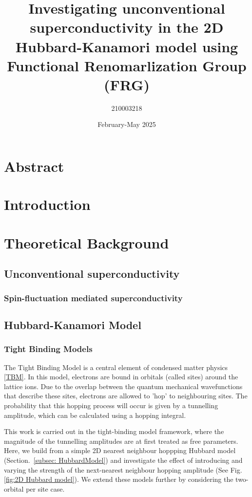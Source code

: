 \documentclass[12pt]{article}
\title{Investigating unconventional superconductivity in the 2D Hubbard-Kanamori model using Functional Renomarlization Group (FRG)}
\author{210003218}
\date{February-May 2025}
\begin{document}
\maketitle
\tableofcontents 


\section{Abstract}

\section{Introduction}

\section{Theoretical Background}

\subsection{Unconventional superconductivity}



\subsubsection{Spin-fluctuation mediated superconductivity}

\subsection{Hubbard-Kanamori Model}

\subsubsection{Tight Binding Models}

The Tight Binding Model is a central element of condensed matter physics \eqref{TBM}. In this model, electrons are bound in orbitals (called sites) around the lattice ions.
Due to the overlap between the quantum mechanical wavefunctions that describe these sites, electrons are allowed to 'hop' to neighbouring sites. The probability that this hopping process will occur is given by a tunnelling amplitude, which can be calculated using a hopping integral. \par
\medskip
\noindent This work is carried out in the tight-binding model framework, where the magnitude of the tunnelling amplitudes are at first treated as free parameters. 
Here, we build from a simple 2D nearest neighbour hoppping Hubbard model (Section.~\ref{subsec: HubbardModel}) and investigate the effect of introducing and varying the strength of the next-nearest neighbour hopping amplitude (See Fig. \ref{fig:2D Hubbard model}).
We extend these models further by considering the two-orbital per site case. 
\end{document}
